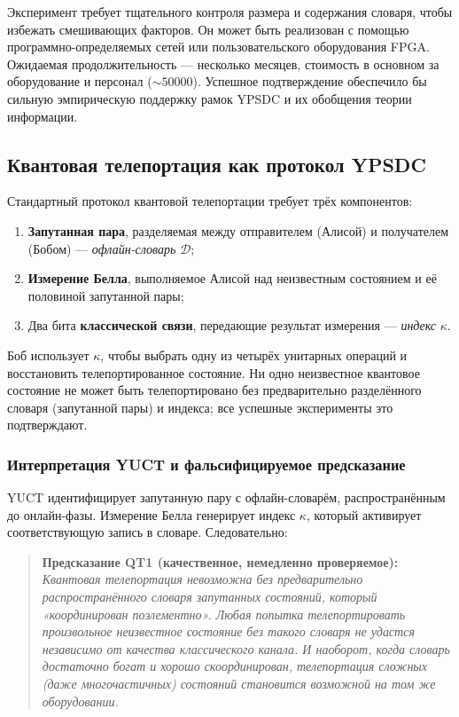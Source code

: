 \documentclass[12pt,a4paper]{article}
\theoremstyle{remark}
\begin{document}
	Эксперимент требует тщательного контроля размера и содержания словаря, чтобы избежать смешивающих факторов. Он может быть реализован с помощью программно-определяемых сетей или пользовательского оборудования FPGA. Ожидаемая продолжительность — несколько месяцев, стоимость в основном за оборудование и персонал ($\sim 50 000$). Успешное подтверждение обеспечило бы сильную эмпирическую поддержку рамок YPSDC и их обобщения теории информации.
	
	\subsection{Квантовая телепортация как протокол YPSDC}
	\label{subsec:qt}
	
	Стандартный протокол квантовой телепортации требует трёх компонентов:
	\begin{enumerate}
		\item \textbf{Запутанная пара}, разделяемая между отправителем (Алисой) и получателем (Бобом) — \emph{офлайн-словарь} $\mathcal{D}$;
		\item \textbf{Измерение Белла}, выполняемое Алисой над неизвестным состоянием и её половиной запутанной пары;
		\item Два бита \textbf{классической связи}, передающие результат измерения — \emph{индекс} $\kappa$.
	\end{enumerate}
	Боб использует $\kappa$, чтобы выбрать одну из четырёх унитарных операций и восстановить телепортированное состояние. Ни одно неизвестное квантовое состояние не может быть телепортировано без предварительно разделённого словаря (запутанной пары) и индекса; все успешные эксперименты это подтверждают.
	
	\subsubsection{Интерпретация YUCT и фальсифицируемое предсказание}
	
	YUCT идентифицирует запутанную пару с офлайн-словарём, распространённым до онлайн-фазы. Измерение Белла генерирует индекс $\kappa$, который активирует соответствующую запись в словаре. Следовательно:
	
	\begin{quote}
		\textbf{Предсказание QT1 (качественное, немедленно проверяемое):}
		\emph{Квантовая телепортация невозможна без предварительно распространённого словаря запутанных состояний, который «координирован поэлементно». Любая попытка телепортировать произвольное неизвестное состояние без такого словаря не удастся независимо от качества классического канала. И наоборот, когда словарь достаточно богат и хорошо скоординирован, телепортация сложных (даже многочастичных) состояний становится возможной на том же оборудовании.}
	\end{quote}
	
\end{document}
